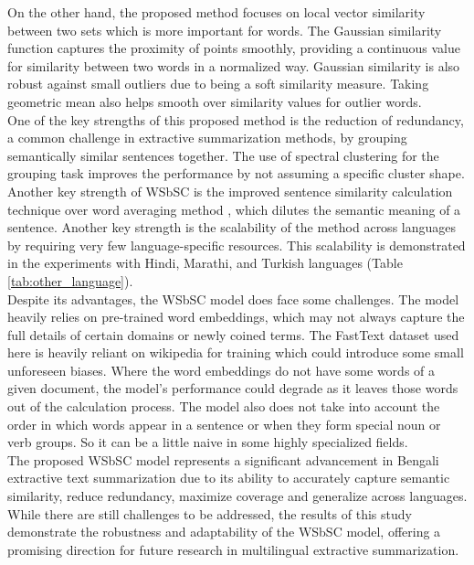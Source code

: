 On the other hand, the proposed method focuses on local vector similarity between two sets which is more important for words. The Gaussian similarity function captures the proximity of points smoothly, providing a continuous value for similarity between two words in a normalized way. Gaussian similarity is also robust against small outliers due to being a soft similarity measure. Taking geometric mean also helps smooth over similarity values for outlier words.\\

One of the key strengths of this proposed method is the reduction of redundancy, a common challenge in extractive summarization methods, by grouping semantically similar sentences together. The use of spectral clustering for the grouping task improves the performance by not assuming a specific cluster shape. Another key strength of WSbSC is the improved sentence similarity calculation technique over word averaging method \cite{roychowdhury-etal-2022-spectral-base}, which dilutes the semantic meaning of a sentence. Another key strength is the scalability of the method across languages by requiring very few language-specific resources. This scalability is demonstrated in the experiments with Hindi, Marathi, and Turkish languages (Table \ref{tab:other_language}).\\

Despite its advantages, the WSbSC model does face some challenges. The model heavily relies on pre-trained word embeddings, which may not always capture the full details of certain domains or newly coined terms. The FastText \cite{grave-etal-2018-fasttext} dataset used here is heavily reliant on wikipedia for training which could introduce some small unforeseen biases. Where the word embeddings do not have some words of a given document, the model’s performance could degrade as it leaves those words out of the calculation process. The model also does not take into account the order in which words appear in a sentence or when they form special noun or verb groups. So it can be a little naive in some highly specialized fields.\\

The proposed WSbSC model represents a significant advancement in Bengali extractive text summarization due to its ability to accurately capture semantic similarity, reduce redundancy, maximize coverage and generalize across languages. While there are still challenges to be addressed, the results of this study demonstrate the robustness and adaptability of the WSbSC model, offering a promising direction for future research in multilingual extractive summarization.
